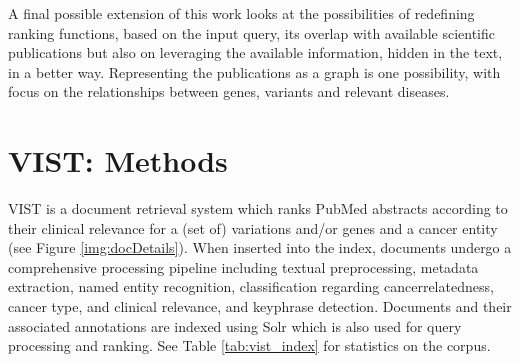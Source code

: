 \documentclass[fleqn,10pt]{wlscirep}
\begin{document}
A final possible extension of this work looks at the possibilities of redefining ranking functions, based on the input query, its overlap with available scientific publications but also on leveraging the available information, hidden in the text, in a better way. Representing the publications as a graph is one possibility, with focus on the relationships between genes, variants and relevant diseases.
%

\section*{VIST: Methods}
VIST is a document retrieval system which ranks PubMed abstracts according to their clinical relevance for a (set of) variations and/or genes and a cancer entity (see Figure \ref{img:docDetails}). When inserted into the index, documents undergo a comprehensive processing pipeline including textual preprocessing, metadata extraction, named entity recognition, classification regarding cancerrelatedness, cancer type, and clinical relevance, and keyphrase detection\cite{seva2018}. Documents and their associated annotations are indexed using Solr which is also used for query processing and ranking. See Table \ref{tab:vist_index} for statistics on the corpus.
\end{document}
